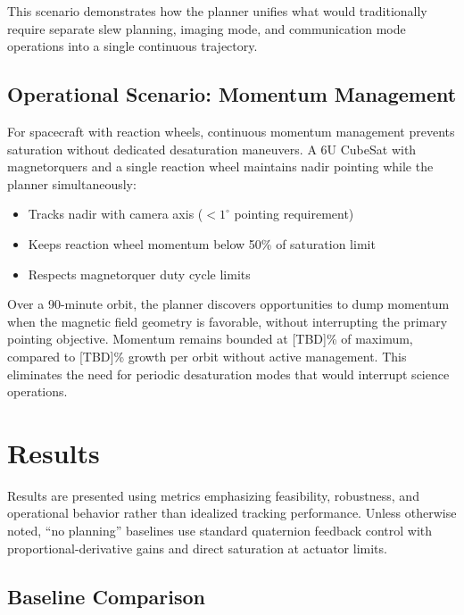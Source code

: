 \documentclass[conference]{IEEEtran}
\begin{document}
This scenario demonstrates how the planner unifies what would traditionally require separate slew planning, imaging mode, and communication mode operations into a single continuous trajectory.

\subsection{Operational Scenario: Momentum Management}\label{subsec:momentum_scenario}

For spacecraft with reaction wheels, continuous momentum management prevents saturation without dedicated desaturation maneuvers. A 6U CubeSat with magnetorquers and a single reaction wheel maintains nadir pointing while the planner simultaneously:

\begin{itemize}
    \item Tracks nadir with camera axis ($<1^\circ$ pointing requirement)
    \item Keeps reaction wheel momentum below 50\% of saturation limit
    \item Respects magnetorquer duty cycle limits
\end{itemize}

Over a 90-minute orbit, the planner discovers opportunities to dump momentum when the magnetic field geometry is favorable, without interrupting the primary pointing objective. Momentum remains bounded at [TBD]\% of maximum, compared to [TBD]\% growth per orbit without active management. This eliminates the need for periodic desaturation modes that would interrupt science operations.


\section{Results}\label{sec:results}

Results are presented using metrics emphasizing feasibility, robustness, and operational behavior rather than idealized tracking performance. Unless otherwise noted, ``no planning'' baselines use standard quaternion feedback control with proportional-derivative gains and direct saturation at actuator limits.

\subsection{Baseline Comparison}\label{subsec:baseline}
\end{document}
